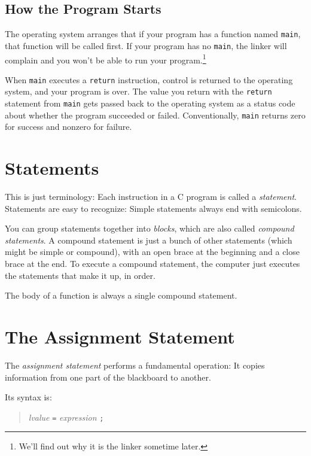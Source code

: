 \subsection{How the Program Starts}

The operating system arranges that if your program has a function named
{\tt main}, that function will be called first.  If your program has no
{\tt main}, the linker will complain and you won't be able to run your
program.\footnote{We'll find out why it is the linker sometime later.}

When {\tt main} executes a {\tt return} instruction, control is returned
to the operating system, and your program is over.  The value you return
with the {\tt return } statement from {\tt main} gets passed back to the
operating system as a status code about whether the program succeeded or
failed. Conventionally, {\tt main} returns zero for success and nonzero
for failure.

\section{Statements}

    This is just terminology: Each instruction in a C program is called
a {\em statement}\/.  Statements are easy to recognize: Simple
statements always end with semicolons.

    You can group statements together into {\em blocks}, which are also
called {\em compound statements}.  A compound statement is just a bunch
of other statements (which might be simple or compound), with an open
brace at the beginning and a close brace at the end.  To execute a
compound statement, the computer just executes the statements that make
it up, in order.

The body of a function is always a single compound statement.

\section{The Assignment Statement}

The {\em assignment statement} performs a fundamental operation:  It
copies information from one part of the blackboard to another.

Its syntax is:

\begin{quotation}
	{\it lvalue} {\tt =} {\it expression} {\tt ;}
\end{quotation}

